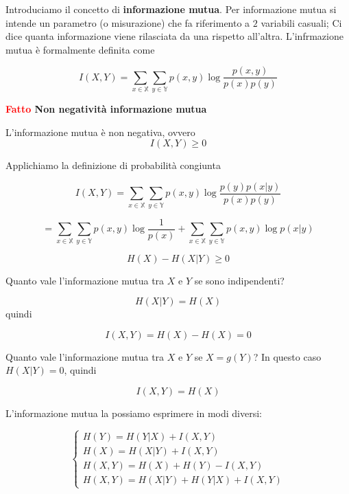 \documentclass[12pt]{report}
\begin{document}
    Introduciamo il concetto di \textbf{informazione mutua}. Per informazione mutua si intende un parametro (o misurazione) che fa riferimento a $2$ variabili casuali; Ci dice quanta informazione viene rilasciata da una rispetto all'altra. L'infrmazione mutua è formalmente definita come


    $$I(X,Y) = \sum_{x \in \mathbb{X}} \sum_{y \in \mathbb{Y}} p(x,y) \log{\frac{p(x,y)}{p(x)p(y)}}$$


    \vspace{5px}
    \begin{tcolorbox}
        \textbf{\textcolor{red}{Fatto} Non negatività informazione mutua}
        \vspace{5px}
        \begin{center}

            L'informazione mutua è non negativa, ovvero
            $$I(X,Y) \geq 0$$

        \end{center}
    \end{tcolorbox}

    \begin{dimo}
        Applichiamo la definizione di probabilità congiunta

        $$I(X,Y) = \sum_{x \in \mathbb{X}} \sum_{y \in \mathbb{Y}} p(x,y) \log{\frac{p(y) p(x|y)}{p(x)p(y)}}$$

        $$=\sum_{x \in \mathbb{X}} \sum_{y \in \mathbb{Y}} p(x,y) \log{\frac{1}{p(x)}} + \sum_{x \in \mathbb{X}} \sum_{y \in \mathbb{Y}} p(x,y) \log{p(x|y)}$$

        $$H(X) - H(X|Y) \geq 0$$
    \end{dimo}

    \begin{es}
        Quanto vale l'informazione mutua tra $X$ e $Y$ se sono indipendenti?

        $$H(X|Y) = H(X)$$
        quindi

        $$I(X,Y) = H(X) - H(X) = 0$$
    \end{es}

    \begin{es}
        Quanto vale l'informazione mutua tra $X$ e $Y$ se $X = g(Y)$?
        In questo caso $H(X|Y) = 0$, quindi

        $$I(X,Y) = H(X)$$
    \end{es}

    L'informazione mutua la possiamo esprimere in modi diversi:

    $$ \begin{cases}
           H(Y) = H(Y|X) + I(X,Y)\\
           H(X) = H(X|Y) + I(X,Y) \\
           H(X,Y) = H(X) + H(Y) - I(X,Y) \\
           H(X,Y) = H(X|Y) + H(Y|X) + I(X,Y)
    \end{cases}$$
\end{document}

